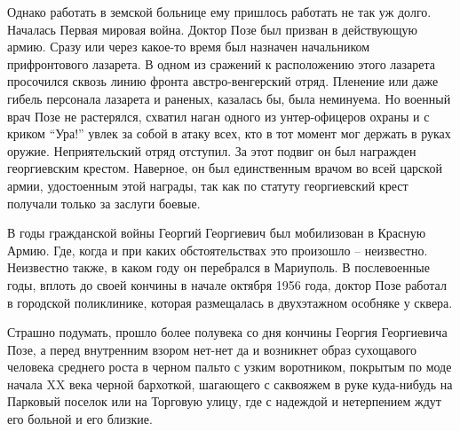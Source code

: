 Однако работать в земской больнице ему пришлось работать не так уж долго.
Началась Первая мировая война. Доктор Позе был призван в действующую армию.
Сразу или через какое-то время был назначен начальником прифронтового лазарета.
В одном из сражений к расположению этого лазарета просочился сквозь линию
фронта австро-венгерский отряд. Пленение или даже гибель персонала лазарета и
раненых, казалась бы, была неминуема. Но военный врач Позе не растерялся,
схватил наган одного из унтер-офицеров охраны и с криком \enquote{Ура!} увлек за собой
в атаку всех, кто в тот момент мог держать в руках оружие. Неприятельский отряд
отступил. За этот подвиг он был награжден георгиевским крестом. Наверное, он
был единственным врачом во всей царской армии, удостоенным этой награды, так
как по статуту георгиевский крест получали только за заслуги боевые.

В годы гражданской войны Георгий Георгиевич был мобилизован в Красную Армию.
Где, когда и при каких обстоятельствах это произошло – неизвестно. Неизвестно
также, в каком году он перебрался в Мариуполь. В послевоенные годы, вплоть до
своей кончины в начале октября 1956 года, доктор Позе работал в городской
поликлинике, которая размещалась в двухэтажном особняке у сквера.

Страшно подумать, прошло более полувека со дня кончины Георгия Георгиевича
Позе, а перед внутренним взором нет-нет да и возникнет образ сухощавого
человека среднего роста в черном пальто с узким воротником, покрытым по моде
начала XX века черной бархоткой, шагающего с саквояжем в руке куда-нибудь на
Парковый поселок или на Торговую улицу, где с надеждой и нетерпением ждут его
больной  и его близкие.
